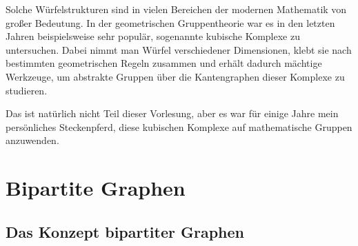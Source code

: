 \begin{math-stroke}
\begin{center}
\end{center}
\end{math-stroke}



\begin{spoken-clean}[00:54:38 - 00:56:52]
Solche Würfelstrukturen sind in vielen Bereichen der modernen Mathematik von großer Bedeutung. In der geometrischen Gruppentheorie war es in den letzten Jahren beispielsweise sehr populär, sogenannte kubische Komplexe zu untersuchen. Dabei nimmt man Würfel verschiedener Dimensionen, klebt sie nach bestimmten geometrischen Regeln zusammen und erhält dadurch mächtige Werkzeuge, um abstrakte Gruppen über die Kantengraphen dieser Komplexe zu studieren.

Das ist natürlich nicht Teil dieser Vorlesung, aber es war für einige Jahre mein persönliches Steckenpferd, diese kubischen Komplexe auf mathematische Gruppen anzuwenden.
\end{spoken-clean}

\section{Bipartite Graphen}

\subsection{Das Konzept bipartiter Graphen}

